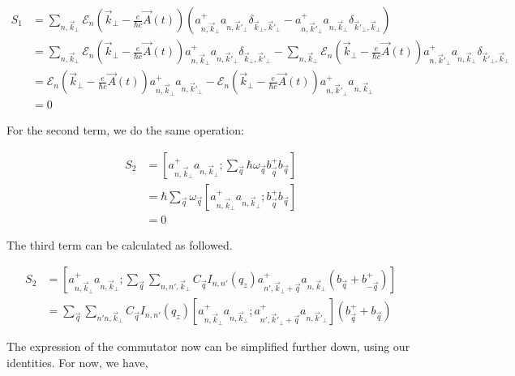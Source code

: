 \documentclass{article}
\begin{document}
\begin{align}
    S_{1}
    &= \sum_{n,\vec{k}_{\perp}} \mathcal{E}_{n}\left(\vec{k}_{\perp} - \frac{e}{\hbar c} \vec{A}(t)\right) \left(a^{+}_{n,\vec{k}_{\perp}} a_{n,\vec{k}'_{\perp}} \delta_{\vec{k}_{\perp},\vec{k}'_{\perp}} - a^{+}_{n,\vec{k}'_{\perp}} a_{n,\vec{k}_{\perp}} \delta_{\vec{k}'_{\perp},\vec{k}_{\perp}}\right)\\
    & = \sum_{n,\vec{k}_{\perp}} \mathcal{E}_{n}\left(\vec{k}_{\perp} - \frac{e}{\hbar c} \vec{A}(t)\right) a^{+}_{n,\vec{k}_{\perp}} a_{n,\vec{k}'_{\perp}} \delta_{\vec{k}_{\perp},\vec{k}'_{\perp}} - \sum_{n,\vec{k}_{\perp}} \mathcal{E}_{n}\left(\vec{k}_{\perp} - \frac{e}{\hbar c} \vec{A}(t)\right) a^{+}_{n,\vec{k}'_{\perp}} a_{n,\vec{k}_{\perp}} \delta_{\vec{k}'_{\perp},\vec{k}_{\perp}}\\
    & = \mathcal{E}_{n}\left(\vec{k}_{\perp} - \frac{e}{\hbar c} \vec{A}(t)\right)a^{+}_{n,\vec{k}_{\perp}} a_{n,\vec{k}'_{\perp}} - \mathcal{E}_{n}\left(\vec{k}_{\perp} - \frac{e}{\hbar c} \vec{A}(t)\right) a^{+}_{n,\vec{k}'_{\perp}} a_{n,\vec{k}_{\perp}}\\
    & = 0
\end{align}

For the second term, we do the same operation:

\begin{align}
    S_{2} & = \left[ a^{+}_{n,\vec{k}_{\perp}}a_{n,\vec{k}_{\perp}} ; \sum_{\vec{q}} \hbar \omega_{\vec{q}} b^{+}_{\vec{q}}b_{\vec{q}} \right] \\
    & = \hbar \sum_{\vec{q}} \omega_{\vec{q}} \left[ a^{+}_{n,\vec{k}_{\perp}} a_{n,\vec{k}_{\perp}}; b^{+}_{\vec{q}}b_{\vec{q}} \right] \\
    & = 0
\end{align}

The third term can be calculated as followed. 

\begin{align}
    S_{2} 
    & = \left[ a^{+}_{n,\vec{k}_{\perp}} a_{n,\vec{k}_{\perp}} ; \sum_{\vec{q}} \sum_{n,n', \vec{k}_{\perp}} C_{\vec{q}} I_{n,n'}(q_{z}) a^{+}_{n',\vec{k}_{\perp}+\vec{q}} a_{n,\vec{k}_{\perp}} \left(b_{\vec{q}} + b^{+}_{- \vec{q}}\right)\right]\\
    & = \sum_{\vec{q}} \sum_{n'n, \vec{k}_{\perp}} C_{\vec{q}} I_{n,n'}(q_{z}) \left[a^{+}_{n,\vec{k}_{\perp}} a_{n,\vec{k}_{\perp}} ; a^{+}_{n',\vec{k}'_{\perp}+\vec{q}} a_{n,\vec{k}'_{\perp}} \right] \left(b^{+}_{\vec{q}}+b_{\vec{q}}\right)
\end{align}

The expression of the commutator now can be simplified further down, using our identities. For now, we have, 
\end{document}
